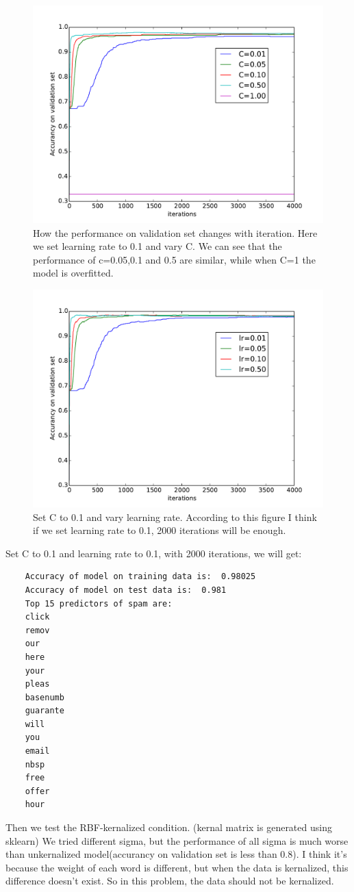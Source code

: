 \documentclass{article}
\begin{document}
\begin{figure}[H]
	\centering
	\includegraphics[width=0.7\linewidth]{./no_kernal_C.pdf}
	\caption{How the performance on validation set changes with iteration. Here we set learning rate to 0.1 and vary C. We can see that the performance of c=0.05,0.1 and 0.5 are similar, while when C=1 the model is overfitted.}\label{fig:3.31}
\end{figure}
\begin{figure}[H]
	\centering
	\includegraphics[width=0.7\linewidth]{./no_kernal_lr.pdf}
	\caption{Set C to 0.1 and vary learning rate. According to this figure I think if we set learning rate to 0.1, 2000 iterations will be enough. }\label{fig:3.31}
\end{figure}

Set C to 0.1 and learning rate to 0.1, with 2000 iterations, we will get:\\
\begin{lstlisting}
	Accuracy of model on training data is:  0.98025
	Accuracy of model on test data is:  0.981
	Top 15 predictors of spam are: 
	click
	remov
	our
	here
	your
	pleas
	basenumb
	guarante
	will
	you
	email
	nbsp
	free
	offer
	hour

\end{lstlisting}
Then we test the RBF-kernalized condition. (kernal matrix is generated using sklearn) We tried different sigma, but the performance of all sigma is much worse than unkernalized model(accurancy on validation set is less than 0.8). I think it's because the weight of each word is different, but when the data is kernalized, this difference doesn't exist. So in this problem, the data should not be kernalized.
\end{document}
